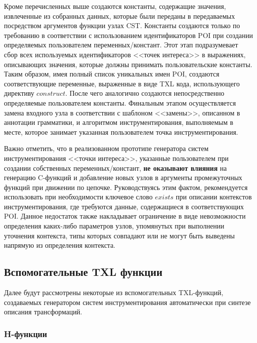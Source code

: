 Кроме перечисленных выше создаются константы, содержащие значения, извлеченные из собранных данных, которые были переданы в передаваемых посредством аргументов функции узлах CST.
Константы создаются только по требованию в соответствии с использованием идентификаторов POI при создании определяемых пользователем переменных/констант.
Этот этап подразумевает сбор всех используемых идентификаторов <<точек интереса>> в выражениях, описывающих значения, которые должны принимать пользовательские константы.
Таким образом, имея полный список уникальных имен POI, создаются соответствующие переменные, выраженные в виде TXL кода, использующего директиву $construct$.
После чего аналогично создаются непосредственно определяемые пользователем константы.
Финальным этапом осуществляется замена входного узла в соответствии с шаблоном <<замены>>, описанном в аннотации грамматики, и алгоритмом инструментирования, выполняемым в месте, которое занимает указанная пользователем точка инструментирования.

Важно отметить, что в реализованном прототипе генератора систем инструментирования <<точки интереса>>, указанные пользователем при создании собственных переменных/констант, \textbf{не оказывают влияния} на генерацию C-функций и добавление новых узлов в аргументы промежуточных функций при движении по цепочке.
Руководствуясь этим фактом, рекомендуется использовать при необходимости ключевое слово $exists$ при описании контекстов инструментирования, где требуются данные, содержащиеся в соответствующих POI.
Данное недостаток также накладывает ограничение в виде невозможности определения каких-либо параметров узлов, упомянутых при выполнении уточнения контекста, типы которых совпадают или не могут быть выведены напрямую из определения контекста.

\subsection{Вспомогательные TXL функции}

Далее будут рассмотрены некоторые из вспомогательных TXL-функций, создаваемых генератором систем инструментирования автоматически при синтезе описания трансформаций.

\subsubsection{H-функции}

